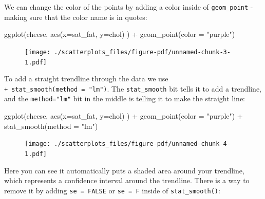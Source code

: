 \documentclass[
  letterpaper,
  DIV=11,
  numbers=noendperiod]{scrreprt}
\newenvironment{Shaded}{\begin{snugshade}}{\end{snugshade}}
\newcommand{\AttributeTok}[1]{\textcolor[rgb]{0.40,0.45,0.13}{#1}}
\newcommand{\FunctionTok}[1]{\textcolor[rgb]{0.28,0.35,0.67}{#1}}
\newcommand{\NormalTok}[1]{\textcolor[rgb]{0.00,0.23,0.31}{#1}}
\newcommand{\SpecialCharTok}[1]{\textcolor[rgb]{0.37,0.37,0.37}{#1}}
\newcommand{\StringTok}[1]{\textcolor[rgb]{0.13,0.47,0.30}{#1}}
\begin{document}
We can change the color of the points by adding a color inside of
\texttt{geom\_point} - making sure that the color name is in quotes:

\begin{Shaded}
\begin{Highlighting}[]
\FunctionTok{ggplot}\NormalTok{(cheese, }\FunctionTok{aes}\NormalTok{(}\AttributeTok{x=}\NormalTok{sat\_fat, }\AttributeTok{y=}\NormalTok{chol) ) }\SpecialCharTok{+} 
  \FunctionTok{geom\_point}\NormalTok{(}\AttributeTok{color =} \StringTok{"purple"}\NormalTok{)}
\end{Highlighting}
\end{Shaded}

\begin{figure}[H]

{\centering \texttt{[image: ./scatterplots\_files/figure-pdf/unnamed-chunk-3-1.pdf]}

}

\end{figure}

To add a straight trendline through the data we use
\texttt{+\ stat\_smooth(method\ =\ "lm")}. The \texttt{stat\_smooth} bit
tells it to add a trendline, and the \texttt{method="lm"} bit in the
middle is telling it to make the straight line:

\begin{Shaded}
\begin{Highlighting}[]
\FunctionTok{ggplot}\NormalTok{(cheese, }\FunctionTok{aes}\NormalTok{(}\AttributeTok{x=}\NormalTok{sat\_fat, }\AttributeTok{y=}\NormalTok{chol) ) }\SpecialCharTok{+} 
  \FunctionTok{geom\_point}\NormalTok{(}\AttributeTok{color =} \StringTok{"purple"}\NormalTok{) }\SpecialCharTok{+}
 \FunctionTok{stat\_smooth}\NormalTok{(}\AttributeTok{method =} \StringTok{"lm"}\NormalTok{)}
\end{Highlighting}
\end{Shaded}

\begin{figure}[H]

{\centering \texttt{[image: ./scatterplots\_files/figure-pdf/unnamed-chunk-4-1.pdf]}

}

\end{figure}

Here you can see it automatically puts a shaded area around your
trendline, which represents a confidence interval around the trendline.
There is a way to remove it by adding \texttt{se\ =\ FALSE} or
\texttt{se\ =\ F} inside of \texttt{stat\_smooth()}:
\end{document}
